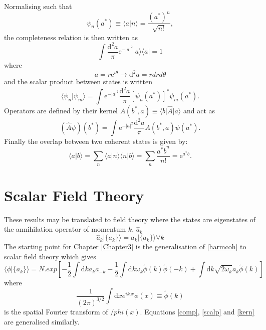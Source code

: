 Normalising such that 
\begin{equation}
\psi_n(a^*) \equiv \langle a \vert n \rangle = \frac{(a^*)^n}{\sqrt{n!}},
\end{equation}
the completeness relation is then written as
\begin{equation}
\label{comp}
\int \frac{\mathrm{d}^2a}{\pi} \mathrm{e}^{-{\vert a \vert}^2} \vert a \rangle \langle a \vert = 1
\end{equation}
where
\begin{equation}
a = r\mathrm{e}^{i\theta} \rightarrow \mathrm{d}^2a = rdrd\theta 
\end{equation}
and the scalar product between states is written
\begin{equation}
\label{scalp}
\langle \psi_n \vert \psi_m \rangle = \int \mathrm{e}^{-{\vert a \vert}^2} \frac{\mathrm{d}^2a}{\pi} [\psi_n(a^*)]^*\psi_m(a^*).
\end{equation}
Operators are defined by their kernel $A(b^*,a) \equiv \langle b \vert {\hat A} \vert a \rangle $ and act as
\begin{equation}
\label{kern}
({\hat A} \psi)(b^*) = \int \mathrm{e}^{-{\vert a \vert}^2} \frac{\mathrm{d}^2a}{\pi} A(b^*,a)\psi(a^*).
\end{equation}
Finally the overlap between two coherent states is given by:
\begin{equation}
\label{overlap}
\langle a \vert b \rangle = \sum_n \langle a \vert n \rangle \langle n \vert b \rangle = \sum_n \frac{{a^*b}^n}{n!} = \mathrm{e}^{a^*b}.
\end{equation}
\section{Scalar Field Theory}
These results may be translated to field theory where the states are eigenstates of the annihilation operator of momentum $k$, ${\hat a_k}$ 
\begin{equation}
{\hat a_k}\vert \{a_k\}\rangle = a_k \vert \{a_k\}\rangle \forall k
\end{equation}
The starting point for Chapter \ref{Chapter3} is the generalisation of \ref{harmcoh} to scalar field theory which gives
\begin{equation}
\langle \phi \vert \{a_k\}\rangle = N.exp\left[-\frac{1}{2} \int \mathrm{d} k a_k a_{-k} -\frac{1}{2} \int \mathrm{d} k \omega_k {\tilde \phi}(k){\tilde \phi}(-k)+\int \mathrm{d}k \sqrt{2\omega_k} a_k {\tilde \phi}(k)\right]
\end{equation}
where 
\begin{equation}
\frac{1}{(2\pi)^{3/2}}\int \mathrm{d}x e^{ik.x}\phi(x) \equiv {\tilde \phi}(k)
\end{equation}
is the spatial Fourier transform of $/phi(x)$. Equations \ref{comp}, \ref{scalp} and \ref{kern} are generalised similarly.